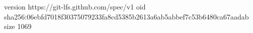 version https://git-lfs.github.com/spec/v1
oid sha256:06ebfd7018f30375079233fa8cd5385b2613a6ab5abbef7c53b6480ca67aadab
size 1069
